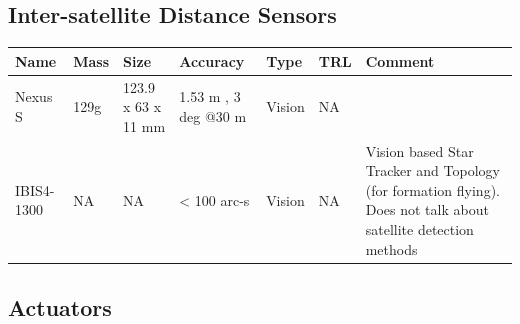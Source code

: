 \subsection{Inter-satellite Distance Sensors}


\begin{center}
     \begin{tabular}{ |p{2cm} | l | l | l | l | l | p{5cm} |}
     \hline

      {\bf Name} & {\bf Mass} & {\bf Size} & {\bf Accuracy} & {\bf Type} & {\bf TRL} & {\bf Comment}  \\ \hline

     Nexus S \cite{Ref:ids2} & 129g & 123.9 x 63 x 11 mm & 1.53 m , 3 deg @30 m & Vision & NA  &   \\ \hline

     IBIS4-1300 \cite{Ref:ids1} & NA & NA & < 100 arc-s & Vision & NA & Vision based Star Tracker and Topology (for formation flying). Does not talk about satellite detection methods \\ \hline
     \end{tabular}
\end{center}


\subsection{Actuators}


